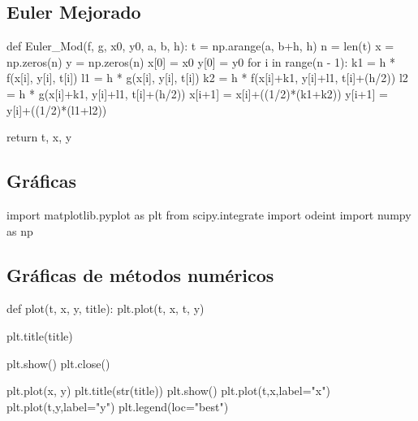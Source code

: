 \documentclass{article}
\begin{document}
          \subsection*{Euler Mejorado}
            \begin{python}
              def Euler_Mod(f, g, x0, y0, a, b, h):
                t = np.arange(a, b+h, h)
                n = len(t)
                x = np.zeros(n)
                y = np.zeros(n)
                x[0] = x0
                y[0] = y0
                for i in range(n - 1):
                    k1 = h * f(x[i], y[i], t[i])
                    l1 = h * g(x[i], y[i], t[i])
                    k2 = h * f(x[i]+k1, y[i]+l1, t[i]+(h/2))
                    l2 = h * g(x[i]+k1, y[i]+l1, t[i]+(h/2))
                    x[i+1] = x[i]+((1/2)*(k1+k2))
                    y[i+1] = y[i]+((1/2)*(l1+l2))

                return t, x, y
            \end{python}
          \subsection*{Gráficas}
            \begin{python}
              import matplotlib.pyplot as plt
              from scipy.integrate import odeint
              import numpy as np
            \end{python}
            \subsection*{Gráficas de métodos numéricos}
            \begin{python}
              def plot(t, x, y, title):
              plt.plot(t, x, t, y)
              
              plt.title(title)
          
              plt.show()
              plt.close()
          
              plt.plot(x, y)
              plt.title(str(title))
              plt.show()
              plt.plot(t,x,label="x")
              plt.plot(t,y,label="y")
              plt.legend(loc="best")
            \end{python}
\end{document}

